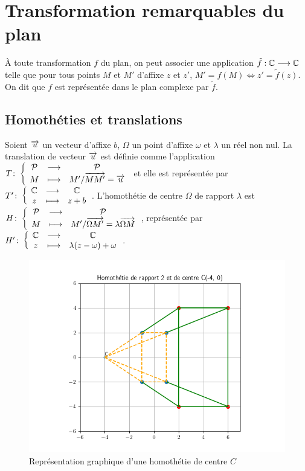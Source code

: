 \section{Transformation remarquables du plan}

À toute transformation \(f\) du plan, on peut associer une application \(\tilde{f} : \mathbb{C} \longrightarrow \mathbb{C}\) telle que pour tous points \(M\) et \(M'\) d'affixe \(z\) et \(z'\), \(M'=f(M) \iff z'=\tilde{f}(z)\). On dit que \(f\) est représentée dans le plan complexe par \(\tilde{f}\).

\subsection{Homothéties et translations}
\begin{defdef}
  Soient \(\overrightarrow{u}\) un vecteur d'affixe \(b\), \(\Omega\) un point d'affixe \(\omega\) et \(\lambda\) un réel non nul. La translation de vecteur \(\overrightarrow{u}\) est définie comme l'application \(T\colon \left\{\begin{array}{ccc} \mathcal{P} & \longrightarrow &\mathcal{P}\\ M & \longmapsto & M' / \overrightarrow{MM'}=\overrightarrow{u} \end{array} \right.\) et elle est représentée par \(T'\colon \left\{\begin{array}{ccc} \mathbb{C} & \longrightarrow &\mathbb{C}\\ z & \longmapsto & z+b \end{array} \right.\). L'homothétie de centre \(\Omega\) de rapport \(\lambda\) est \(H\colon \left\{\begin{array}{ccc} \mathcal{P} & \longrightarrow &\mathcal{P}\\ M & \longmapsto & M' / \overrightarrow{\Omega M'}=\lambda \overrightarrow{\Omega M} \end{array} \right.\), représentée par \(H'\colon \left\{\begin{array}{ccc} \mathbb{C} & \longrightarrow &\mathbb{C}\\ z & \longmapsto & \lambda(z-\omega)+\omega \end{array} \right.\).
\end{defdef}
 \begin{figure}
   \centering
   \includegraphics[scale=0.7]{homothetie.png}
   \caption{Représentation graphique d'une homothétie de centre \(C\)}
   \label{fig:homothetie}
 \end{figure}

